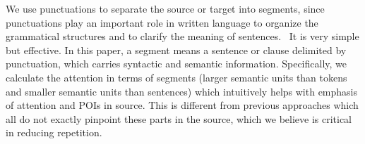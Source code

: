 We use punctuations to separate the source or target into segments,
since punctuations play an important role in written language to organize
the grammatical structures and to clarify the meaning of sentences.~\citep{briscoe1996,Kim19,LiWE19}
It is very simple but effective. 
In this paper, a segment means 
a sentence or clause delimited by punctuation,
which carries syntactic and semantic information. 
Specifically, we calculate the attention in terms of segments 
(larger semantic units than tokens and smaller semantic units than sentences)
which intuitively helps with emphasis of attention and POIs in source.
This is different from previous approaches
which all do not exactly pinpoint these parts in the source,
which we believe is critical in reducing repetition. 

